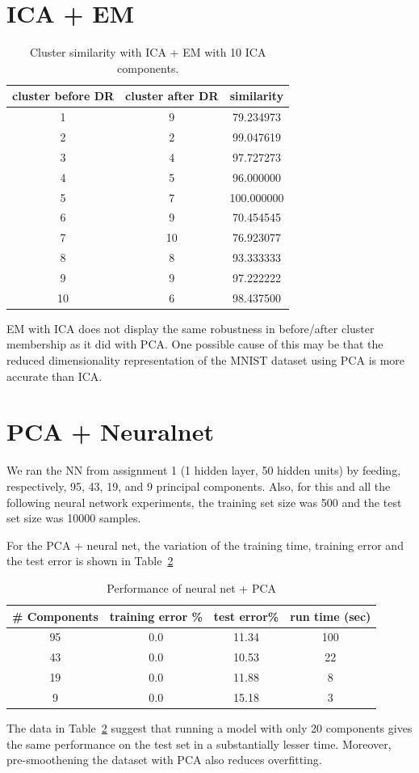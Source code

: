 \documentclass[10pt,letterpaper]{article}
\begin{document}
\section{ICA + EM}
\begin{table}[tbp]
\begin{center}
    \begin{tabular}{c|c|c }
    \hline
    {\bf cluster before DR}&{\bf cluster after DR}&{\bf similarity} \\ \hline
        1 & 9 & 79.234973\\ 
        2 & 2 & 99.047619\\ 
        3 & 4 & 97.727273\\ 
        4 & 5 & 96.000000\\ 
        5 & 7 & 100.000000\\ 
        6 & 9 & 70.454545\\ 
        7 & 10 & 76.923077\\ 
        8 & 8 & 93.333333\\ 
        9 & 9 & 97.222222\\ 
        10 & 6 & 98.437500 \\ \hline
    \end{tabular}
\end{center}
\caption{Cluster similarity with ICA + EM with 10 ICA components. \label{kmica}}
\end{table}
EM with ICA does not display the same robustness in before/after cluster membership as it did with PCA. One possible cause of this may be that the reduced dimensionality representation of the MNIST dataset using PCA is more accurate than ICA. 
\section{PCA + Neuralnet}
We ran the NN from assignment 1 (1 hidden layer, 50 hidden units) by feeding, respectively, 95, 43, 19, and 9 principal components. Also, for this and all the following neural network experiments, the training set size was 500 and the test set size was 10000 samples. 

For the PCA + neural net, the variation of the training time, training error and the test error is shown in Table~\ref{pcann}
\begin{table}[tbp]
\begin{center}
    \begin{tabular}{c|c|c |c}
    \hline
    {\bf \# Components}&{\bf training error \%}&{\bf test error\%} & {\bf run time (sec)} \\ \hline
	95 & 0.0 & 11.34 & 100 \\
	43 & 0.0 & 10.53 & 22 \\
	19 & 0.0 & 11.88 & 8 \\
	9 & 0.0 & 15.18 & 3 \\ \hline
    \end{tabular}
\end{center}
\caption{Performance of neural net + PCA \label{pcann}}
\end{table}
%
The data in Table~\ref{pcann} suggest that running a model with only 20 components gives the same performance on the test set in a substantially lesser time. Moreover, pre-smoothening the dataset with PCA also reduces overfitting. 
\end{document}
